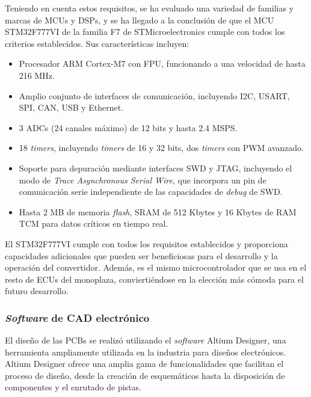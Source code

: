 Teniendo en cuenta estos requisitos, se ha evaluado una variedad de familias y marcas de MCUs y DSPs, y se ha llegado a la conclusión de que el MCU STM32F777VI de la familia F7 de STMicroelectronics cumple con todos los criterios establecidos. Sus características incluyen:

\begin{itemize}
	\item Procesador ARM Cortex-M7 con FPU, funcionando a una velocidad de hasta 216 MHz.
	\item Amplio conjunto de interfaces de comunicación, incluyendo I2C, USART, SPI, CAN, USB y Ethernet.
	\item 3 ADCs (24 canales máximo) de 12 bits y hasta 2.4 MSPS.
	\item 18 \textit{timers}, incluyendo \textit{timers} de 16 y 32 bits, dos \textit{timers} con PWM avanzado.
	\item Soporte para depuración mediante interfaces SWD y JTAG, incluyendo el modo de \textit{Trace Asynchronous Serial Wire}, que incorpora un pin de comunicación serie independiente de las capacidades de \textit{debug} de SWD.
	\item Hasta 2 MB de memoria \textit{flash}, SRAM de 512 Kbytes y 16 Kbytes de RAM TCM para datos críticos en tiempo real.
\end{itemize}

El STM32F777VI cumple con todos los requisitos establecidos y proporciona capacidades adicionales que pueden ser beneficiosas para el desarrollo y la operación del convertidor. Además, es el mismo microcontrolador que se usa en el resto de ECUs del monoplaza, conviertiéndose en la elección más cómoda para el futuro desarrollo.


\subsubsection{\textit{Software} de CAD electrónico}

El diseño de las PCBs se realizó utilizando el \textit{software} Altium Designer, una herramienta ampliamente utilizada en la industria para diseños electrónicos. Altium Designer ofrece una amplia gama de funcionalidades que facilitan el proceso de diseño, desde la creación de esquemáticos hasta la disposición de componentes y el enrutado de pistas.

